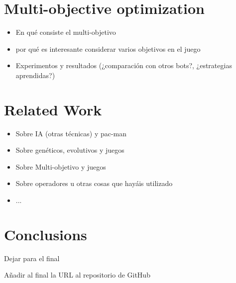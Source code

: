 \documentclass{llncs}
\begin{document}
%
\section{Multi-objective optimization}
\label{sec:sec3}
%

\begin{itemize}
\item En qué consiste el multi-objetivo
\item por qué es interesante considerar varios objetivos en el juego
\item Experimentos y resultados (¿comparación con otros bots?, ¿estrategias aprendidas?)
\end{itemize}

%
\section{Related Work}
\label{sec:relatedWork}
%

\begin{itemize}
\item Sobre IA (otras técnicas) y pac-man
\item Sobre genéticos, evolutivos y juegos
\item Sobre Multi-objetivo y juegos 
\item Sobre operadores u otras cosas que hayáis utilizado
\item ...
\end{itemize}


%
\section{Conclusions}
\label{sec:conclusions}
%


Dejar para el final

Añadir al final la URL al repositorio de GitHub



\end{document}
